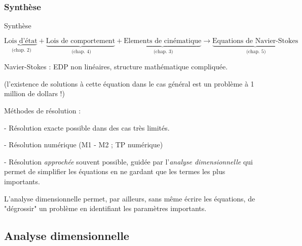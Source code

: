 \subsubsection{Synthèse}
\begin{frame}{Synthèse}  
\small

$$
\underbrace{\mbox{Lois d'état}}_{\mbox{ (chap. 2)}}  + \underbrace{\mbox{Lois de comportement}}_{\mbox{ (chap. 4)}} + 
\underbrace{\mbox{Elements de cinématique}}_{\mbox{ (chap. 3)}} 
\rightarrow \underbrace{\mbox{Equations de Navier-Stokes}}_{\mbox{ (chap. 5)}}
$$

\medskip \pause 

Navier-Stokes : EDP non linéaires, structure mathématique compliquée. 

(l'existence de solutions à cette équation dans le cas général est un problème à 1 million de dollars !)

\medskip \pause 

Méthodes de résolution :

\pause
- Résolution exacte possible dans des cas très limités.

\pause
- Résolution numérique (M1 - M2 ; TP numérique) 

\pause
- Résolution {\em approchée } souvent possible, guidée par l'{\em analyse dimensionnelle } qui permet de simplifier les équations en ne gardant que les
 termes les plus importants.




\medskip
\pause

L'analyse dimensionnelle permet, par ailleurs, sans même écrire les équations, de "dégrossir" un problème en identifiant les paramètres importants.

\end{frame}


\subsection{\bfseries Analyse dimensionnelle}


